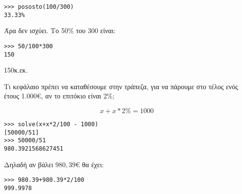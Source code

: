 \begin{lstlisting}
>>> pososto(100/300)
33.33%
\end{lstlisting}
Άρα δεν ισχύει. Το 50\% του 300 είναι:
\begin{lstlisting}
>>> 50/100*300
150
\end{lstlisting}
150κ.εκ.
\begin{exercise}
Τι κεφάλαιο πρέπει να καταθέσουμε στην τράπεζα, για να πάρουμε στο
τέλος ενός έτους 1.000€, αν το επιτόκιο είναι 2\%;
\end{exercise}
$$ x + x*2\% = 1000$$
\begin{lstlisting}
>>> solve(x+x*2/100 - 1000)
[50000/51]
>>> 50000/51
980.3921568627451
\end{lstlisting}
Δηλαδή αν βάλει $980,39$€ θα έχει:
\begin{lstlisting}
>>> 980.39+980.39*2/100
999.9978
\end{lstlisting}
